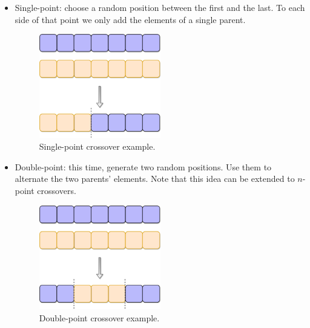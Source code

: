 			\begin{itemize}

				\item
				Single-point: choose a random position between the first and the last. To each side of that point we only add the elements of a single parent.

				\vspace{0.2cm}

			    \begin{figure}[bth]

			        \myfloatalign
			        \includegraphics[width=0.5\textwidth]{gfx/SinglePointCrossover.png}
			        \caption{Single-point crossover example.}

			    \end{figure}

			    \item
			    Double-point: this time, generate two random positions. Use them to alternate the two parents' elements. Note that this idea can be extended to $n$-point crossovers.

			    \vspace{0.2cm}

			    \begin{figure}[bth]

			        \myfloatalign
			        \includegraphics[width=0.5\textwidth]{gfx/DoublePointCrossover.png}
			        \caption{Double-point crossover example.}


\end{figure}
\end{itemize}
